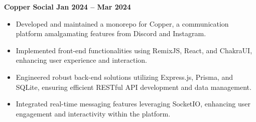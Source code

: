 \textbf{{Copper Social} \hfill Jan 2024 -- Mar 2024} \par
\begin{itemize}
	\item Developed and maintained a monorepo for Copper, a communication platform amalgamating features from Discord and Instagram.
    \item Implemented front-end functionalities using RemixJS, React, and ChakraUI, enhancing user experience and interaction.
    \item Engineered robust back-end solutions utilizing Express.js, Prisma, and SQLite, ensuring efficient RESTful API development and data management.
    \item Integrated real-time messaging features leveraging SocketIO, enhancing user engagement and interactivity within the platform.
\end{itemize}\vspace{0.1cm}\par